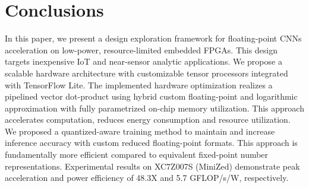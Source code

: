 \section{Conclusions}
\label{sec:conclusions}
In this paper, we present a design exploration framework for floating-point CNNs acceleration on low-power, resource-limited embedded FPGAs. This design targets inexpensive IoT and near-sensor analytic applications. We propose a scalable hardware architecture with customizable tensor processors integrated with TensorFlow Lite. The implemented hardware optimization realizes a pipelined vector dot-product using hybrid custom floating-point and logarithmic approximation with fully parametrized on-chip memory utilization. This approach accelerates computation, reduces energy consumption and resource utilization. We proposed a quantized-aware training method to maintain and increase inference accuracy with custom reduced floating-point formats. This approach is fundamentally more efficient compared to equivalent fixed-point number representations. Experimental results on XC7Z007S (MiniZed) demonstrate peak acceleration and power efficiency of 48.3X and 5.7 GFLOP/s/W, respectively.